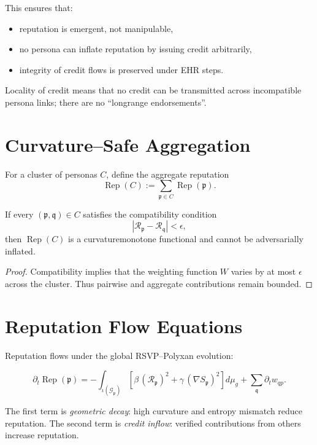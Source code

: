 This ensures that:

\begin{itemize}
  \item reputation is emergent, not manipulable,
  \item no persona can inflate reputation by issuing credit arbitrarily,
  \item integrity of credit flows is preserved under EHR steps.
\end{itemize}

Locality of credit means that no credit can be transmitted across incompatible persona links;  
there are no “long\textendash range endorsements”.

\section{Curvature–Safe Aggregation}

For a cluster of personas $C$,
define the aggregate reputation
\[
\operatorname{Rep}(C)
  := \sum_{\mathfrak{p} \in C} \operatorname{Rep}(\mathfrak{p}).
\]

\begin{proposition}
If every $(\mathfrak{p}, \mathfrak{q}) \in C$ satisfies the compatibility condition
\[
\left|\mathcal{R}_{\mathfrak{p}} - \mathcal{R}_{\mathfrak{q}}\right| 
  < \epsilon,
\]
then $\operatorname{Rep}(C)$ is a curvature\textendash monotone functional
and cannot be adversarially inflated.
\end{proposition}

\begin{proof}
Compatibility implies that the weighting function $W$ varies by at most $\epsilon$ across the cluster.
Thus pairwise and aggregate contributions remain bounded.
\end{proof}

\section{Reputation Flow Equations}

Reputation flows under the global RSVP–Polyxan evolution:

\[
\partial_t \operatorname{Rep}(\mathfrak{p})
  = - \int_{\iota(\mathcal{G}_{\mathfrak{p}})}
        \left[
        \beta\, (\mathcal{R}_{\mathfrak{p}})^2
       + \gamma\, (\nabla S_{\mathfrak{p}})^2
       \right] d\mu_g
   + \sum_{\mathfrak{q}} \partial_t w_{q p}.
\]

The first term is \emph{geometric decay}:  
high curvature and entropy mismatch reduce reputation.  
The second term is \emph{credit inflow}:  
verified contributions from others increase reputation.


